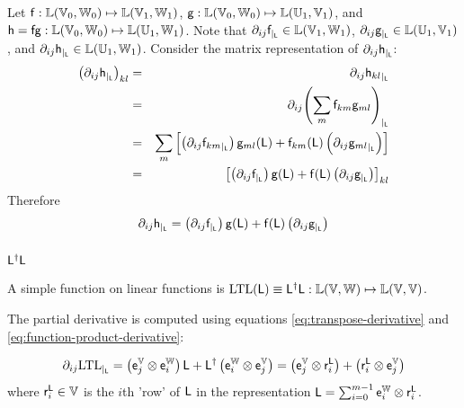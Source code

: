 Let
$\mathsf{f} : \mathbb{L}(\mathbb{V}_0,\mathbb{W}_0) \mapsto \mathbb{L}(\mathbb{V}_1,\mathbb{W}_1)$,
$\mathsf{g} : \mathbb{L}(\mathbb{V}_0,\mathbb{W}_0) \mapsto \mathbb{L}(\mathbb{U}_1,\mathbb{V}_1)$,
and
$\mathsf{h} = \mathsf{f}\mathsf{g} : \mathbb{L}(\mathbb{V}_0,\mathbb{W}_0) \mapsto \mathbb{L}(\mathbb{U}_1,\mathbb{W}_1)$.
Note that
${\partial}_{ij}{\mathsf{f}}_{\mid_{\mathsf{L}}} \in  \mathbb{L}(\mathbb{V}_1,\mathbb{W}_1)$,
${\partial}_{ij}{\mathsf{g}}_{\mid_{\mathsf{L}}} \in  \mathbb{L}(\mathbb{U}_1,\mathbb{V}_1)$,
and
${\partial}_{ij}{\mathsf{h}}_{\mid_{\mathsf{L}}} \in  \mathbb{L}(\mathbb{U}_1,\mathbb{W}_1)$.
Consider the matrix representation of ${\partial}_{ij}{\mathsf{h}}_{\mid_{\mathsf{L}}}$:
\begin{eqnarray}
\left( {\partial}_{ij}{\mathsf{h}}_{\mid_{\mathsf{L}}} \right)_{kl}
& = &
{\partial}_{ij}{\mathsf{h}_{kl}}_{\mid_{\mathsf{L}}}
\\
& = &
{\partial}_{ij}{\left( \sum_{m} \mathsf{f}_{km} \mathsf{g}_{ml} \right)}_{\mid_{\mathsf{L}}}
\nonumber
\\
& = &
\sum_{m}  \left[
\left( {\partial}_{ij}{\mathsf{f}_{km}}_{\mid_{\mathsf{L}}} \right) \mathsf{g}_{ml}(\mathsf{L})
+
\mathsf{f}_{km}(\mathsf{L}) \left( {\partial}_{ij}{\mathsf{g}_{ml}}_{\mid_{\mathsf{L}}} \right)
\right]
\nonumber
\\
& = &
\left[
\left( {\partial}_{ij}{\mathsf{f}}_{\mid_{\mathsf{L}}} \right) \mathsf{g}(\mathsf{L})
+
\mathsf{f}(\mathsf{L}) \left( {\partial}_{ij}{\mathsf{g}}_{\mid_{\mathsf{L}}} \right)
\right]_{kl}
\nonumber
\end{eqnarray}
Therefore
\begin{equation}
\label{eq:function-product-derivative}
{\partial}_{ij}{\mathsf{h}}_{\mid_{\mathsf{L}}}
 =
\left( {\partial}_{ij}{\mathsf{f}}_{\mid_{\mathsf{L}}} \right) \mathsf{g}(\mathsf{L})
+
\mathsf{f}(\mathsf{L}) \left( {\partial}_{ij}{\mathsf{g}}_{\mid_{\mathsf{L}}} \right)
\end{equation}


\subsubsection{$\mathsf{L}^{\dagger} \mathsf{L}$}
\label{sec:LTL}

A simple function on linear functions
is $\mathrm{LTL}(\mathsf{L}) \equiv \mathsf{L}^{\dagger} \mathsf{L}
: \mathbb{L}(\mathbb{V},\mathbb{W}) \mapsto \mathbb{L}(\mathbb{V},\mathbb{V})$.

The partial derivative is computed using equations
\ref{eq:transpose-derivative}
and
\ref{eq:function-product-derivative}:

\begin{equation}
{\partial}_{ij}{\mathrm{LTL}}_{\mid_{\mathsf{L}}}
=
\left( \mathsf{e}_j^{\mathbb{V}} \otimes \mathsf{e}_i^{\mathbb{W}} \right) \mathsf{L}
+
\mathsf{L}^{\dagger} \left( \mathsf{e}_i^{\mathbb{W}} \otimes \mathsf{e}_j^{\mathbb{V}} \right)
=
\left( \mathsf{e}_j^{\mathbb{V}} \otimes \mathsf{r}_i^{\mathsf{L}} \right)
+
\left( \mathsf{r}_i^{\mathsf{L}} \otimes \mathsf{e}_j^{\mathbb{V}} \right)
\end{equation}
where $\mathsf{r}_i^{\mathsf{L}} \in \mathbb{V}$ is the $i$th 'row' of $\mathsf{L}$
in the representation $\mathsf{L} = \sum_{i=0}^{m-1} \mathsf{e}_i^{\mathbb{W}} \otimes \mathsf{r}_i^{\mathsf{L}}$.

